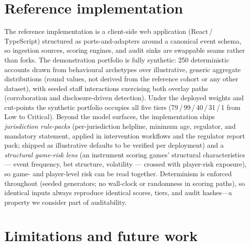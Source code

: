 \documentclass[11pt]{article}
\begin{document}
\section{Reference implementation}\label{sec:reference}

The reference implementation is a client-side web application (React\,/\,TypeScript)
structured as ports-and-adapters around a canonical event schema, so ingestion sources,
scoring engines, and audit sinks are swappable seams rather than forks. The
demonstration portfolio is fully synthetic: 250 deterministic accounts drawn from
behavioural archetypes over illustrative, generic aggregate distributions (round
values, not derived from the reference cohort or any other dataset), with
seeded staff interactions exercising both overlay paths (corroboration and
disclosure-driven detection). Under the deployed weights and cut-points the synthetic
portfolio occupies all five tiers (79\,/\,99\,/\,40\,/\,31\,/\,1 from Low to
Critical). Beyond the model surfaces, the implementation ships \emph{jurisdiction
rule-packs} (per-jurisdiction helpline, minimum age, regulator, and mandatory
statement, applied in intervention workflows and the regulator report pack; shipped as
illustrative defaults to be verified per deployment) and a \emph{structural game-risk
lens} (an instrument scoring games' structural characteristics --- event frequency,
bet structure, volatility --- crossed with player-risk exposure), so game- and
player-level risk can be read together. Determinism is enforced throughout (seeded generators; no wall-clock or
randomness in scoring paths), so identical inputs always reproduce identical scores,
tiers, and audit hashes---a property we consider part of auditability.

\section{Limitations and future work}\label{sec:limitations}
\end{document}
